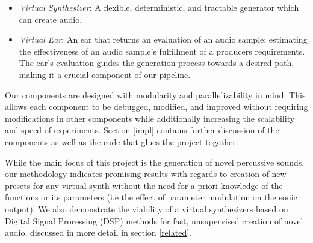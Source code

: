 \documentclass{nime-alternate} %
\begin{document}
\begin{itemize}
    \item \textit{Virtual Synthesizer}: A flexible, deter\-min\-istic, and tract\-able gener\-ator which can create audio. 
    \item \textit{Virtual Ear}: An ear that returns an evaluation of an audio sample; estimating the effectiveness of an audio sample's fulfillment of a producers requirements. The ear's evaluation guides the generation process towards a desired path, making it a crucial component of our pipeline. 
\end{itemize}

Our components are designed with modularity and parallelizability in mind. This allows each component to be debugged, modified, and improved without requiring modifications in other components while additionally increasing the scalability and speed of experiments. 
Section \ref{impl} contains further discussion of the components as well as the code that glues the project together.

While the main focus of this project is the generation of novel percussive sounds, our methodology indicates promising results with regards to creation of new presets for any virtual synth without the need for a-priori knowledge of the functions or its parameters (i.e the effect of parameter modulation on the sonic output). We also demonstrate the viability of a virtual synthesizers based on Digital Signal Processing (DSP) methods for fast, unsupervised creation of novel audio, discussed in more detail in section \ref{related}. 
\end{document}
